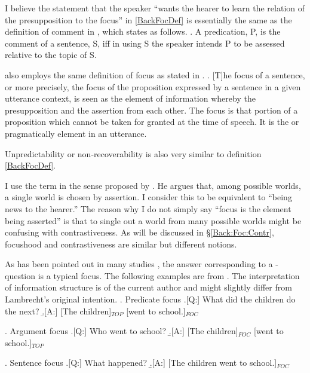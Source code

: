 I believe the statement that the speaker ``wants the hearer to learn the relation of the presupposition to the focus'' in \ref{BackFocDef} is essentially the same as the definition of comment in ,
which states as follows.
%
\ex. A predication, P, is the comment of a sentence, S, iff in using S the speaker intends P to be assessed relative to the topic of S.
     \hfill{\cite[p.~210]{gundel88}}

 \cite[based on][]{halliday67} also employs the same definition of focus as stated in \Next.
%
\ex. [T]he focus of a sentence, or more precisely,
  the focus of the proposition expressed by a sentence
  in a given utterance context,
  is seen as the element of information whereby the presupposition 
  and the assertion  from each other.
  The focus is that portion of a proposition which
  cannot be taken for granted at the time of speech.
  It is the  or pragmatically
   element in an utterance.
  \hfill{\cite[p.~207, underlined by the original author]{lambrecht94}}

Unpredictability or non-recoverability \cite[see also][]{kuno72} is also very similar to definition \ref{BackFocDef}.

I use the term  in the sense proposed by .
He argues that, among possible worlds, a single world is chosen by assertion.
I consider this to be equivalent to ``being news to the hearer.''
The reason why I do not simply say ``focus is the element being asserted'' is that
to single out a world from many possible worlds might be confusing with contrastiveness.
As will be discussed in \S \ref{Back:Foc:Contr},
focushood and contrastiveness are similar but different notions.

As has been pointed out in many studies \cite[e.g.,][]{matsushita28,chomsky65,gundel74},
the answer corresponding to a -question is a typical focus.
The following examples are from .
The interpretation of information structure is of the current author
and might slightly differ from Lambrecht's original intention.
%
\ex. \label{BackLambPredFoc}{Predicate focus}
	\a.[Q:] What did the children do the next?
	\b.[A:] {[The children]$_{TOP}$ [went to school.]$_{FOC}$}

\ex. \label{BackLambArgFoc}{Argument focus}
	\a.[Q:] Who went to school?
	\b.[A:] {[The children]$_{FOC}$ [went to school.]$_{TOP}$}

\ex. \label{BackLambAllFoc}{Sentence focus}
	\a.[Q:] What happened?
	\b.[A:] {[The children went to school.]$_{FOC}$}


